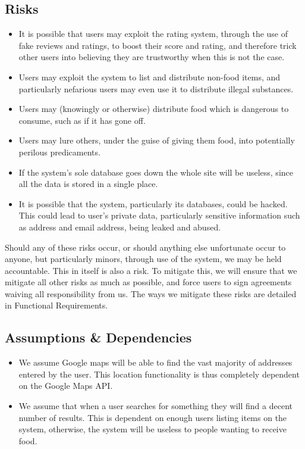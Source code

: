 \documentclass[12pt]{article}
\begin{document}
\subsection{Risks}
\begin{itemize}

    \item It is possible that users may exploit the rating system, through the use of fake reviews and ratings, to boost their score and rating, and therefore trick other users into believing they are trustworthy when this is not the case.

    \item Users may exploit the system to list and distribute non-food items, and particularly nefarious users may even use it to distribute illegal substances.
    
    \item Users may (knowingly or otherwise) distribute food which is dangerous to consume, such as if it has gone off.
    
    \item Users may lure others, under the guise of giving them food, into potentially perilous predicaments.
    
    \item If the system’s sole database goes down the whole site will be useless, since all the data is stored in a single place.
    
    \item It is possible that the system, particularly its databases, could be hacked. This could lead to user’s private data, particularly sensitive information such as address and email address, being leaked and abused.
    
    \end{itemize}

Should any of these risks occur, or should anything else unfortunate occur to anyone, but particularly minors, through use of the system, we may be held accountable. This in itself is also a risk. To mitigate this, we will ensure that we mitigate all other risks as much as possible, and force users to sign agreements waiving all responsibility from us. The ways we mitigate these risks are detailed in Functional Requirements.

\subsection{Assumptions \& Dependencies}
\begin{itemize}

    \item We assume Google maps will be able to find the vast majority of addresses entered by the user. This location functionality is thus completely dependent on the Google Maps API.

    \item We assume that when a user searches for something they will find a decent number of results. This is dependent on enough users listing items on the system, otherwise, the system will be useless to people wanting to receive food.

\end{itemize}
\end{document}

